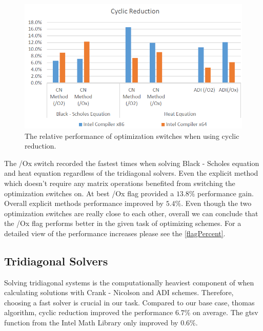 \documentclass[12pt, oneside]{book}
\theoremstyle{plain}
\theoremstyle{definition}
\begin{document}
\begin{figure}[!htb]
    \label{cyclicBar}
    \centering
        \includegraphics[scale=0.6]{cyclicFlagBar.png}
    \caption{The relative performance of optimization switches when using cyclic reduction.}
\end{figure}

The /Ox switch recorded the fastest times when solving Black - Scholes equation and heat equation regardless of the tridiagonal solvers. Even the explicit method which doesn't require any matrix operations benefited from switching the optimization switches on. At best /Ox flag provided a $13.8 \%$ performance gain. Overall explicit methods performance improved by $5.4 \%$. Even though the two optimization switches are really close to each other, overall we can conclude that the /Ox flag performs better in the given task  of optimizing schemes. For a detailed view of the performance increases please see the \ref{flagPercent}.

\subsection{Tridiagonal Solvers}
Solving tridiagonal systems is the computationally heaviest component of when calculating solutions with Crank - Nicolson and ADI schemes. Therefore, choosing a fast solver is crucial in our task. Compared to our base case, thomas algorithm, cyclic reduction improved the performance $6.7 \%$ on average. The gtsv function from the Intel Math Library only improved by $0.6 \%$. 
\end{document}
